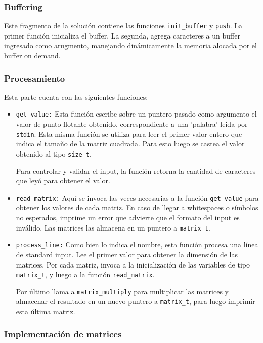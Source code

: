 \documentclass[a4paper,10pt, spanish]{article}
\begin{document}
\subsubsection{Buffering}

Este fragmento de la solución contiene las funciones \lstinline{init_buffer} y \lstinline{push}. La primer función inicializa el buffer. 
La segunda, agrega caracteres a un buffer ingresado como arugmento, manejando dinámicamente la memoria alocada por el buffer on demand.

\subsubsection{Procesamiento}

Esta parte cuenta con las siguientes funciones: 

\begin{itemize}
  \item \lstinline{get_value:} Esta función escribe sobre un puntero pasado como argumento el valor de punto flotante obtenido, correspondiente a una 'palabra' leida por \lstinline{stdin}. 
  Esta misma función se utiliza para leer el primer valor entero que indica el tamaño de la matriz cuadrada. Para esto luego se castea el valor obtenido al tipo \lstinline{size_t}.
  
  Para controlar y validar el input, la función retorna la cantidad de caracteres que leyó para obtener el valor.
	\item \lstinline{read_matrix:} Aquí se invoca las veces necesarias a la función \lstinline{get_value} para obtener los valores de cada matriz.
  En caso de llegar a whitespaces o símbolos no esperados, imprime un error que advierte que el formato del input es inválido. Las matrices las almacena en un puntero a \lstinline{matrix_t}.

  \item \lstinline{process_line:} Como bien lo indica el nombre, esta función procesa una línea de standard input. Lee el primer valor para obtener la dimensión de las matrices. 
  Por cada matriz, invoca a la inicialización de las variables de tipo \lstinline{matrix_t}, y luego a la función \lstinline{read_matrix}.
  
  Por último llama a \lstinline{matrix_multiply} para multiplicar las matrices y almacenar el resultado en un nuevo puntero a \lstinline{matrix_t}, para luego imprimir esta última matriz.
\end{itemize}


\subsubsection{Implementación de matrices}
\end{document}
